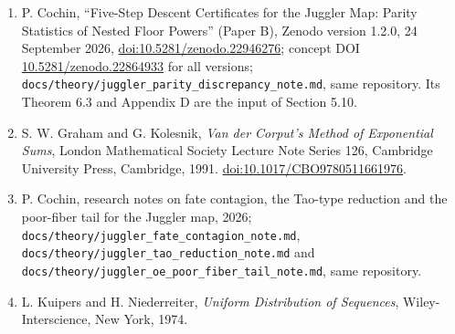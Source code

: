 \documentclass[11pt,a4paper]{article}
\begin{document}
\begin{enumerate}
  (Paper A), Zenodo version 1.0.2, 20 September 2026,
  \href{https://doi.org/10.5281/zenodo.22865237}{doi:10.5281/zenodo.22865237};
  concept DOI
  \href{https://doi.org/10.5281/zenodo.22676452}{10.5281/zenodo.22676452}
  for all versions; revision of 21 September 2026 at
  \texttt{\nolinkurl{docs/theory/juggler_finite_dynamics_note.md}} in
  the repository \url{https://github.com/sneakyweasel/btlab/}.
\item
  P. Cochin, ``Five-Step Descent Certificates for the Juggler Map:
  Parity Statistics of Nested Floor Powers'' (Paper B), Zenodo version
  1.2.0, 24 September 2026,
  \href{https://doi.org/10.5281/zenodo.22946276}{doi:10.5281/zenodo.22946276};
  concept DOI
  \href{https://doi.org/10.5281/zenodo.22864933}{10.5281/zenodo.22864933}
  for all versions;
  \texttt{\nolinkurl{docs/theory/juggler_parity_discrepancy_note.md}},
  same repository. Its Theorem 6.3 and Appendix D are the input of
  Section 5.10.
\item
  S. W. Graham and G. Kolesnik, \emph{Van der Corput's Method of
  Exponential Sums}, London Mathematical Society Lecture Note Series
  126, Cambridge University Press, Cambridge, 1991.
  \href{https://doi.org/10.1017/CBO9780511661976}{doi:10.1017/CBO9780511661976}.
\item
  P. Cochin, research notes on fate contagion, the Tao-type reduction
  and the poor-fiber tail for the Juggler map, 2026;
  \texttt{\nolinkurl{docs/theory/juggler_fate_contagion_note.md}},
  \texttt{\nolinkurl{docs/theory/juggler_tao_reduction_note.md}} and
  \texttt{\nolinkurl{docs/theory/juggler_oe_poor_fiber_tail_note.md}},
  same repository.
\item
  L. Kuipers and H. Niederreiter, \emph{Uniform Distribution of
  Sequences}, Wiley-Interscience, New York, 1974.
\end{enumerate}

\endgroup
\end{document}
